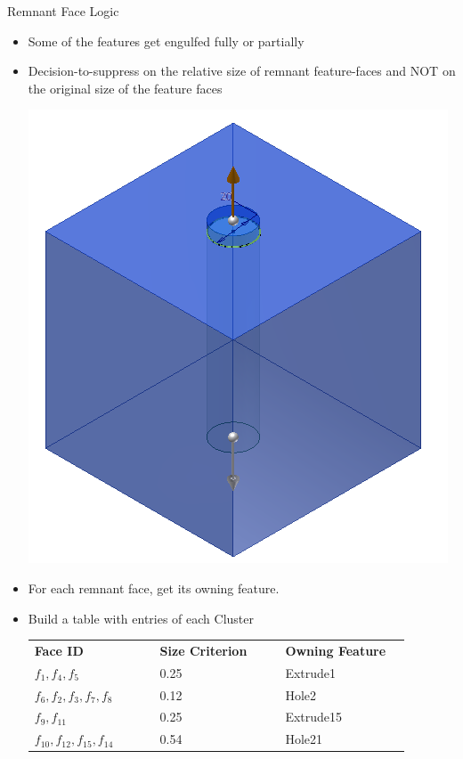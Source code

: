 \begin{frame}{Remnant Face Logic}

\begin{itemize}[noitemsep,label=\textbullet,topsep=2pt,parsep=2pt,partopsep=2pt]
\item Some of the features get engulfed fully or partially
\item Decision-to-suppress on the relative size of remnant feature-faces and NOT on the original size of the feature faces

\includegraphics[width=0.2\linewidth]{..//Common/images/Solid_Simple_SmallProtrusion.png}
\item For each remnant face, get its owning feature. 
\item Build a table with entries of each Cluster
\vskip 2mm
\begin{tabular}[h]{@{} p{0.3\linewidth} p{0.3\linewidth}@{}p{0.3\linewidth} }
\textbf{Face ID} & \textbf{Size Criterion} & \textbf{Owning Feature}\\
$f_1, f_4, f_5$ &	0.25	& Extrude1\\
$f_6, f_2, f_3, f_7, f_8$	& 0.12	& Hole2\\
$f_9, f_{11}$	& 0.25	& Extrude15\\
$f_{10}, f_{12}, f_{15}, f_{14}$ &	0.54	& Hole21\\
\end{tabular}
\end{itemize}

\end{frame}
